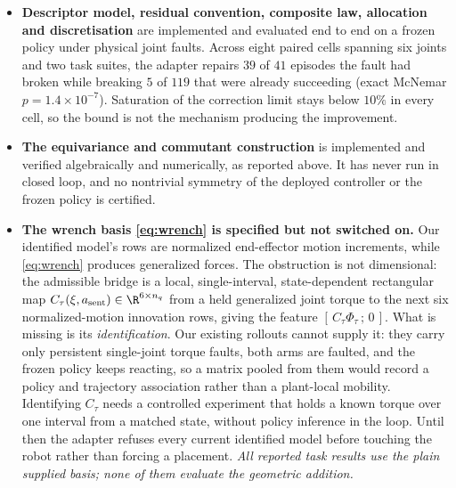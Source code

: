 \begin{itemize}\itemsep2pt
\item \textbf{Descriptor model, residual convention, composite law, allocation and
discretisation} are implemented and evaluated end to end on a frozen policy under
physical joint faults. Across eight paired cells spanning six joints and two task
suites, the adapter repairs $39$ of $41$ episodes the fault had broken while
breaking $5$ of $119$ that were already succeeding (exact McNemar
$p=1.4\times10^{-7}$). Saturation of the correction limit stays below $10\%$ in
every cell, so the bound is not the mechanism producing the improvement.

\item \textbf{The equivariance and commutant construction} is implemented and
verified algebraically and numerically, as reported above. It has never run in
closed loop, and no nontrivial symmetry of the deployed controller or the frozen
policy is certified.

\item \textbf{The wrench basis \eqref{eq:wrench} is specified but not switched on.}
Our identified model's rows are normalized end-effector motion increments, while
\eqref{eq:wrench} produces generalized forces. The obstruction is not dimensional:
the admissible bridge is a local, single-interval, state-dependent rectangular map
$C_\tau(\xi,a_{\mathrm{sent}})\in\R^{6\times n_q}$ from a held generalized joint
torque to the next six normalized-motion innovation rows, giving the feature
$[\,C_\tau\Phi_\tau\,;\,0\,]$. What is missing is its \emph{identification}. Our
existing rollouts cannot supply it: they carry only persistent single-joint torque
faults, both arms are faulted, and the frozen policy keeps reacting, so a matrix
pooled from them would record a policy and trajectory association rather than a
plant-local mobility. Identifying $C_\tau$ needs a controlled experiment that
holds a known torque over one interval from a matched state, without policy
inference in the loop. Until then the adapter refuses every current identified
model before touching the robot rather than forcing a placement. \emph{All
reported task results use the plain supplied basis; none of them evaluate the
geometric addition.}
\end{itemize}
